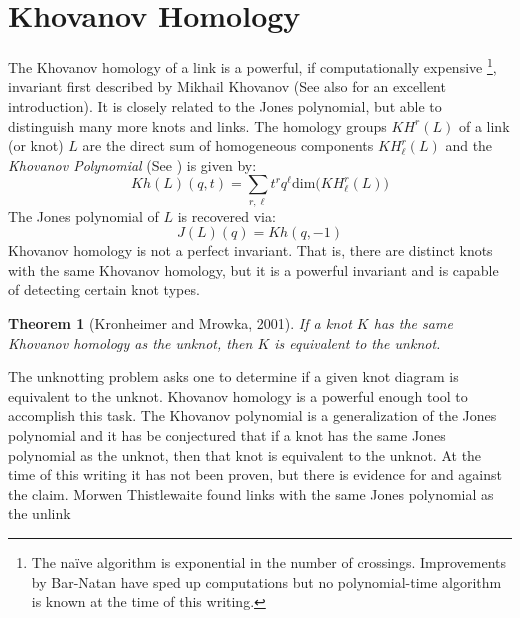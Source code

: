 \documentclass{article}
\theoremstyle{plain}
\newtheorem{theorem}{Theorem}
\begin{document}
    \section{Khovanov Homology}
        The Khovanov homology of a link is a powerful, if computationally
        expensive%
        \footnote{%
            The na\"{i}ve algorithm is exponential in the number of
            crossings. Improvements by Bar-Natan \cite{BarNatanFastKhoHo}
            have sped up computations but no polynomial-time algorithm is
            known at the time of this writing.
        },
        invariant first described by Mikhail Khovanov
        \cite{Khovanov1999CatJonesPoly} (See also \cite{barnatan2002khovanov}
        for an excellent introduction). It is closely related to the Jones
        polynomial, but able to distinguish many more knots and links. The
        homology groups $KH^{r}(L)$ of a link (or knot) $L$ are the direct sum
        of homogeneous components $KH_{\ell}^{r}(L)$ and the
        \textit{Khovanov Polynomial} (See \cite{KatlasKhoHo}) is given by:
        \begin{equation}
            Kh(L)(q,t)=
            \sum_{r,\ell}t^{r}q^{\ell}\textrm{dim}\big(KH_{\ell}^{r}(L)\big)
        \end{equation}
        The Jones polynomial of $L$ is recovered via:
        \begin{equation}
            J(L)(q)=Kh(q,-1)
        \end{equation}
        Khovanov homology is not a perfect invariant. That is, there are
        distinct knots with the same Khovanov homology, but it is a powerful
        invariant and is capable of detecting certain knot types.
        \begin{theorem}[Kronheimer and Mrowka, 2001]
            If a knot $K$ has the same Khovanov homology as the unknot, then $K$
            is equivalent to the unknot.
        \end{theorem}
        The unknotting problem asks one to determine if a given knot diagram is
        equivalent to the unknot. Khovanov homology is a powerful enough tool
        to accomplish this task. The Khovanov polynomial is a generalization of
        the Jones polynomial and it has be conjectured that if a
        knot has the same Jones polynomial as the unknot, then that knot is
        equivalent to the unknot. At the time of this writing it has not been
        proven, but there is evidence for and against the claim. Morwen
        Thistlewaite found links with the same Jones polynomial as the unlink
\end{document}
